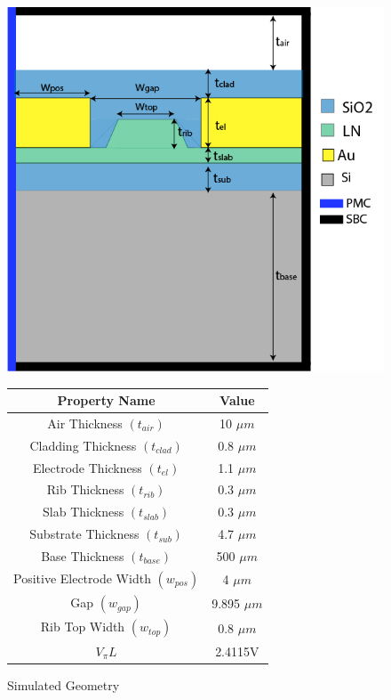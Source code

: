     
    \begin{figure}[h!]
    	\begin{minipage}{0.5\textwidth}
    			\centering
    			\includegraphics[width=0.85\linewidth]{simulation geometry.png} %
    			\caption{Simulated Geometry}
    		\label{fig:microwave2D_wang-et-al}
		\end{minipage}%
\hfill
    \begin{minipage}{0.55\textwidth}
        \centering
        \begin{tabular}{|c|c|}
            \hline
            Property Name & Value  \\ \hline
            Air Thickness $(t_{air})$ & 10 $\mu m $  \\ \hline
            Cladding Thickness $(t_{clad})$ & 0.8 $\mu m $   \\ \hline
            Electrode Thickness $(t_{el})$ & 1.1 $\mu m $   \\ \hline
            Rib Thickness $(t_{rib})$ & 0.3 $\mu m $   \\ \hline
            Slab Thickness $(t_{slab})$ & 0.3 $\mu m $   \\ \hline
            Substrate Thickness $(t_{sub})$ & 4.7 $\mu m $  \\ \hline
            Base Thickness $(t_{base})$ & 500 $\mu m $    \\ \hline
            Positive Electrode Width $(w_{pos})$ & 4 $\mu m $  \\ \hline
            Gap $(w_{gap})$ & 9.895 $\mu m $    \\ \hline
            Rib Top Width $(w_{top})$ & 0.8 $\mu m $    \\ \hline
            $V_\pi L$ & 2.4115V    \\ \hline
        \end{tabular}
        \label{table:wang-et-al}
    \end{minipage}
\end{figure}
   

